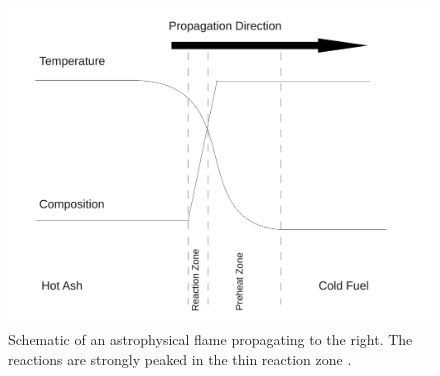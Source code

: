 \documentclass[apj,twocolumn]{emulateapj}
\begin{document}
\begin{figure}[h]
\begin{center}
\centerline{\includegraphics[scale=0.4,angle=0]{./Plots/flame_schematic.pdf}}
\caption{Schematic of an astrophysical flame propagating to the right. The 
reactions are strongly peaked in the thin reaction zone \citep{flamecurve}.}
\label{fig:flame}
\end{center}
\end{figure}



\end{document}

